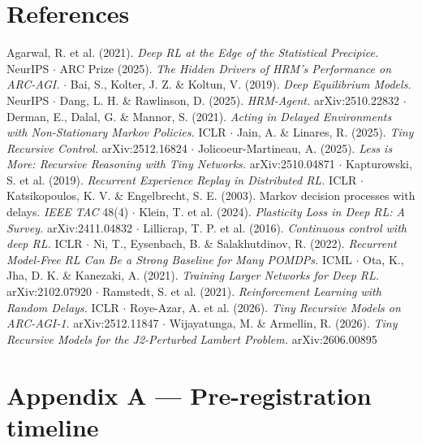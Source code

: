 \documentclass[11pt]{article}
\begin{document}
\section*{References}



Agarwal, R. et al. (2021). \emph{Deep RL at the Edge of the Statistical Precipice.} NeurIPS $\cdot$ ARC Prize (2025). \emph{The Hidden Drivers of HRM's Performance on ARC-AGI.} $\cdot$ Bai, S., Kolter, J. Z. \& Koltun, V. (2019). \emph{Deep Equilibrium Models.} NeurIPS $\cdot$ Dang, L. H. \& Rawlinson, D. (2025). \emph{HRM-Agent.} arXiv:2510.22832 $\cdot$ Derman, E., Dalal, G. \& Mannor, S. (2021). \emph{Acting in Delayed Environments with Non-Stationary Markov Policies.} ICLR $\cdot$ Jain, A. \& Linares, R. (2025). \emph{Tiny Recursive Control.} arXiv:2512.16824 $\cdot$ Jolicoeur-Martineau, A. (2025). \emph{Less is More: Recursive Reasoning with Tiny Networks.} arXiv:2510.04871 $\cdot$ Kapturowski, S. et al. (2019). \emph{Recurrent Experience Replay in Distributed RL.} ICLR $\cdot$ Katsikopoulos, K. V. \& Engelbrecht, S. E. (2003). Markov decision processes with delays. \emph{IEEE TAC} 48(4) $\cdot$ Klein, T. et al. (2024). \emph{Plasticity Loss in Deep RL: A Survey.} arXiv:2411.04832 $\cdot$ Lillicrap, T. P. et al. (2016). \emph{Continuous control with deep RL.} ICLR $\cdot$ Ni, T., Eysenbach, B. \& Salakhutdinov, R. (2022). \emph{Recurrent Model-Free RL Can Be a Strong Baseline for Many POMDPs.} ICML $\cdot$ Ota, K., Jha, D. K. \& Kanezaki, A. (2021). \emph{Training Larger Networks for Deep RL.} arXiv:2102.07920 $\cdot$ Ramstedt, S. et al. (2021). \emph{Reinforcement Learning with Random Delays.} ICLR $\cdot$ Roye-Azar, A. et al. (2026). \emph{Tiny Recursive Models on ARC-AGI-1.} arXiv:2512.11847 $\cdot$ Wijayatunga, M. \& Armellin, R. (2026). \emph{Tiny Recursive Models for the J2-Perturbed Lambert Problem.} arXiv:2606.00895



\section*{Appendix A --- Pre-registration timeline}
\end{document}

